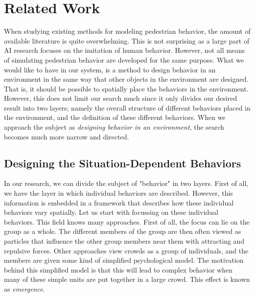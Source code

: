 \documentclass[11pt]{book}
\begin{document}
\chapter{Related Work}
When studying existing methods for modeling pedestrian behavior, the amount of available literature is quite overwhelming. This is not surprising as a large part of AI research focuses on the imitation of human behavior. However, not all means of simulating pedestrian behavior are developed for the same purpose. What we would like to have in our system, is a method to design behavior in an environment in the same way that other objects in the environment are designed. That is, it should be possible to spatially place the behaviors in the environment. However, this does not limit our search much since it only divides our desired result into two layers; namely the overall structure of different behaviors placed in the environment, and the definition of these different behaviors. When we approach the subject as \emph{designing behavior in an environment}, the search becomes much more narrow and directed.

\section{Designing the Situation-Dependent Behaviors}
In our research, we can divide the subject of "behavior" in two layers.  First of all, we have the layer in which individual behaviors are described. However, this information is embedded in a framework that describes how these individual behaviors vary spatially. Let us start with focussing on these individual behaviors. This field knows many approaches. First of all, the focus can lie on the group as a whole. The different members of the group are then often viewed as particles that influence the other group members near them with attracting and repulsive forces. Other approaches view crowds as a group of individuals, and the members are given some kind of simplified psychological model. The motivation behind this simplified model is that this will lead to complex behavior when many of these simple units are put together in a large crowd. This effect is known as \emph{emergence}.\\
\end{document}
